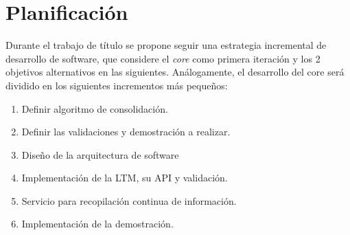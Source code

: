 

\section{Planificaci\'on}

Durante el trabajo de t\'itulo se propone seguir una estrategia incremental de desarrollo de software, que considere el \textit{core} como primera iteraci\'on y los 2 objetivos alternativos en las siguientes. An\'alogamente, el desarrollo del core ser\'a dividido en los siguientes incrementos m\'as peque\~nos:
\begin{enumerate}[topsep=0pt]
\setlength\itemsep{0.2em}
\item Definir algoritmo de consolidaci\'on.

\item Definir las validaciones y demostraci\'on a realizar.

\item Dise\~no de la arquitectura de software

\item Implementaci\'on de la LTM, su API y validaci\'on.

\item Servicio para recopilaci\'on continua de informaci\'on.

\item Implementaci\'on de la demostraci\'on.
\end{enumerate}

